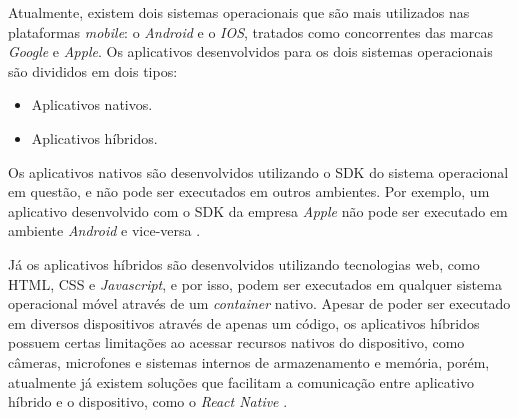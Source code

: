 Atualmente, existem dois sistemas operacionais que são mais utilizados nas plataformas \textit{mobile}: o \textit{Android} e o \textit{IOS}, tratados como concorrentes das marcas \textit{Google} e \textit{Apple}. Os aplicativos desenvolvidos para os dois sistemas operacionais são divididos em dois tipos:
\begin{itemize}
\item Aplicativos nativos.
\item Aplicativos híbridos.
\end{itemize}

Os aplicativos nativos são desenvolvidos utilizando o \gls{SDK} do sistema operacional em questão, e não pode ser executados em outros ambientes. Por exemplo, um aplicativo desenvolvido com o \gls{SDK} da empresa \textit{Apple} não pode ser executado em ambiente \textit{Android} e vice-versa \cite{MobileApps}.

Já os aplicativos híbridos são desenvolvidos utilizando tecnologias web, como \gls{HTML}, \gls{CSS} e \textit{Javascript}, e por isso, podem ser executados em qualquer sistema operacional móvel através de um \textit{container} nativo. Apesar de poder ser executado em diversos dispositivos através de apenas um código, os aplicativos híbridos	 possuem certas limitações ao acessar recursos nativos do dispositivo, como câmeras, microfones e sistemas internos de armazenamento e memória, porém, atualmente já existem soluções que facilitam a comunicação entre aplicativo híbrido e o dispositivo, como o \textit{React Native} \cite{MobileApps}.






